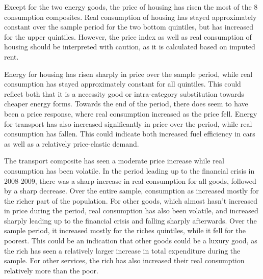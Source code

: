 Except for the two energy goods, the price of housing has risen the most of the 8 consumption composites. Real consumption of housing has stayed approximately constant over the sample period for the two bottom quintiles, but has increased for the upper quintiles. However, the price index as well as real consumption of housing should be interpreted with caution, as it is calculated based on imputed rent. 

Energy for housing has risen sharply in price over the sample period, while real consumption has stayed approximately constant for all quintiles. This could reflect both that it is a necessity good or intra-category substitution towards cheaper energy forms. Towards the end of the period, there does seem to have been a price response, where real consumption increased as the price fell. Energy for transport has also increased significantly in price over the period, while real consumption has fallen. This could indicate both increased fuel efficiency in cars as well as a relatively price-elastic demand. 

The transport composite has seen a moderate price increase while real consumption has been volatile. In the period leading up to the financial crisis in 2008-2009, there was a sharp increase in real consumption for all goods, followed by a sharp decrease. Over the entire sample, consumption as increased mostly for the richer part of the population. For other goods, which almost hasn't increased in price during the period, real consumption has also been volatile, and increased sharply leading up to the financial crisis and falling sharply afterwards. Over the sample period, it increased mostly for the riches quintiles, while it fell for the poorest. This could be an indication that other goods could be a luxury good, as the rich has seen a relatively larger increase in total expenditure during the sample. For other services, the rich has also increased their real consumption relatively more than the poor. 




